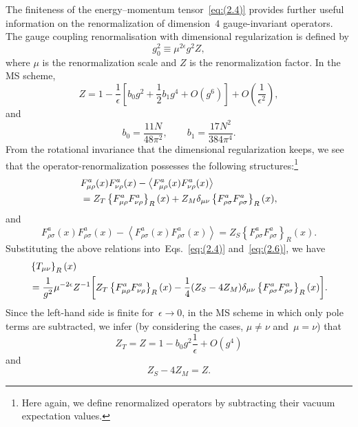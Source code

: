 The finiteness of the energy--momentum tensor~\eqref{eq:(2.4)} provides further
useful information on the renormalization of dimension~$4$ gauge-invariant
operators. The gauge coupling renormalisation with dimensional regularization
is defined by
\begin{equation}
   g_0^2\equiv\mu^{2\epsilon}g^2Z,
\label{eq:(2.7)}
\end{equation}
where $\mu$ is the renormalization scale and $Z$ is the renormalization factor.
In the MS scheme,
\begin{equation}
   Z=1-\frac{1}{\epsilon}
   \left[b_0g^2+\frac{1}{2}b_1g^4+O(g^6)\right]
   +O\left(\frac{1}{\epsilon^2}\right),
\label{eq:(2.8)}
\end{equation}
and
\begin{equation}
   b_0=\frac{11N}{48\pi^2},\qquad
   b_1=\frac{17N^2}{384\pi^4}.
\label{eq:(2.9)}
\end{equation}
From the rotational invariance that the dimensional regularization keeps, we
see that the operator-renormalization possesses the following
structures:\footnote{Here again, we define renormalized operators by
subtracting their vacuum expectation values.}
\begin{align}
   &F_{\mu\rho}^a(x)F_{\nu\rho}^a(x)
   -\left\langle F_{\mu\rho}^a(x)F_{\nu\rho}^a(x)\right\rangle
\notag\\
   &=Z_T\left\{F_{\mu\rho}^aF_{\nu\rho}^a\right\}_R(x)
   +Z_M\delta_{\mu\nu}\left\{F_{\rho\sigma}^aF_{\rho\sigma}^a\right\}_R(x),
\label{eq:(2.10)}
\end{align}
and
\begin{equation}
   F_{\rho\sigma}^a(x)F_{\rho\sigma}^a(x)
   -\left\langle F_{\rho\sigma}^a(x)F_{\rho\sigma}^a(x)\right\rangle
   =Z_S\left\{F_{\rho\sigma}^aF_{\rho\sigma}^a\right\}_R(x).
\label{eq:(2.11)}
\end{equation}
Substituting the above relations into~Eqs.~\eqref{eq:(2.4)}
and~\eqref{eq:(2.6)}, we have
\begin{align}
   &\left\{T_{\mu\nu}\right\}_R(x)
\notag\\
   &=\frac{1}{g^2}\mu^{-2\epsilon}
   Z^{-1}\biggl[Z_T\left\{F_{\mu\rho}^aF_{\nu\rho}^a\right\}_R(x)
   -\frac{1}{4}(Z_S-4Z_M)
   \delta_{\mu\nu}\left\{F_{\rho\sigma}^aF_{\rho\sigma}^a\right\}_R(x)
   \biggr].
\label{eq:(2.12)}
\end{align}
Since the left-hand side is finite for~$\epsilon\to0$, in the MS scheme in
which only pole terms are subtracted, we infer (by considering the cases,
$\mu\neq\nu$ and~$\mu=\nu$) that
\begin{equation}
   Z_T=Z=1-b_0g^2\frac{1}{\epsilon}+O(g^4)
\label{eq:(2.13)}
\end{equation}
and
\begin{equation}
   Z_S-4Z_M=Z.
\label{eq:(2.14)}
\end{equation}


